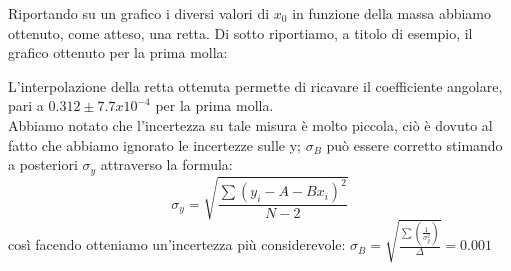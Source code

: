 \documentclass[a4paper]{article}
\theoremstyle{definition}
\begin{document}
		\begin{figure}[!h]
			\captionsetup{labelformat=empty}
		\end{figure}
	
	\noindent 	Riportando su un grafico i diversi valori di \(x_{0}\) in funzione della massa abbiamo ottenuto, come atteso, una retta. Di sotto riportiamo, a titolo di esempio, il grafico ottenuto per la prima molla:\\
		\begin{figure}[!htbp]
		\end{figure}

\noindent	L'interpolazione della retta ottenuta permette di ricavare il coefficiente angolare, pari a \(0.312 \pm 7.7x10^{-4}\) per la prima molla.\\
Abbiamo notato che l'incertezza su tale misura è molto piccola, ciò è dovuto al fatto che abbiamo ignorato le incertezze sulle y; \(\sigma_{B}\) può essere corretto stimando a posteriori \(\sigma_{y}\) attraverso la formula:
\[\sigma_{y} = \sqrt{\frac{\sum (y_{i}-A-Bx_{i})^{2}}{N-2}}\] 
così facendo otteniamo un'incertezza più considerevole: \(\sigma_{B} =  \sqrt{\frac{\sum(\frac{1}{\sigma_{y}^{2}})}{\Delta}} = 0.001\)\\
\end{document}
